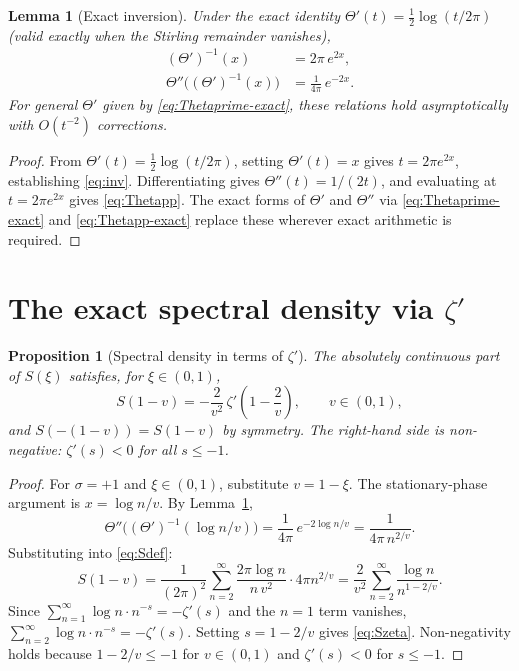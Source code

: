 \documentclass[11pt,reqno]{amsart}
\newtheorem{proposition}[theorem]{Proposition}
\newtheorem{lemma}[theorem]{Lemma}
\theoremstyle{definition}
\theoremstyle{remark}
\begin{document}
\begin{lemma}[Exact inversion]\label{lem:inv}
Under the exact identity \(\Theta'(t) = \tfrac{1}{2}\log(t/2\pi)\)
\textup{(}valid exactly when the Stirling remainder vanishes\textup{)},
\begin{align}
  (\Theta')^{-1}(x) &= 2\pi\,e^{2x}, \label{eq:inv}\\
  \Theta''\!\bigl((\Theta')^{-1}(x)\bigr) &= \frac{1}{4\pi}\,e^{-2x}. \label{eq:Thetapp}
\end{align}
For general \(\Theta'\) given by \eqref{eq:Thetaprime-exact}, these
relations hold asymptotically with \(O(t^{-2})\) corrections.
\end{lemma}

\begin{proof}
From \(\Theta'(t) = \tfrac{1}{2}\log(t/2\pi)\), setting
\(\Theta'(t)=x\) gives \(t = 2\pi e^{2x}\), establishing
\eqref{eq:inv}. Differentiating gives \(\Theta''(t) = 1/(2t)\), and
evaluating at \(t = 2\pi e^{2x}\) gives \eqref{eq:Thetapp}. The exact
forms of \(\Theta'\) and \(\Theta''\) via \eqref{eq:Thetaprime-exact}
and \eqref{eq:Thetapp-exact} replace these wherever exact arithmetic is
required.
\end{proof}

\section{The exact spectral density via \(\zeta'\)}

\begin{proposition}[Spectral density in terms of \(\zeta'\)]\label{prop:Szeta}
The absolutely continuous part of \(S(\xi)\) satisfies, for
\(\xi \in (0,1)\),
\begin{equation}\label{eq:Szeta}
  S(1-v) = -\frac{2}{v^2}\,\zeta'\!\!\left(1-\frac{2}{v}\right),
  \qquad v \in (0,1),
\end{equation}
and \(S(-(1-v)) = S(1-v)\) by symmetry. The right-hand side is
non-negative: \(\zeta'(s) < 0\) for all \(s \le -1\).
\end{proposition}

\begin{proof}
For \(\sigma = +1\) and \(\xi \in (0,1)\), substitute
\(v = 1-\xi\). The stationary-phase argument is \(x = \log n/v\).
By Lemma~\ref{lem:inv},
\[
  \Theta''\!\bigl((\Theta')^{-1}(\log n/v)\bigr)
  = \frac{1}{4\pi}\,e^{-2\log n/v}
  = \frac{1}{4\pi\,n^{2/v}}.
\]
Substituting into \eqref{eq:Sdef}:
\[
  S(1-v)
  = \frac{1}{(2\pi)^2}\sum_{n=2}^{\infty}
    \frac{2\pi\log n}{n\,v^2}\cdot 4\pi n^{2/v}
  = \frac{2}{v^2}\sum_{n=2}^{\infty}\frac{\log n}{n^{1-2/v}}.
\]
Since \(\sum_{n=1}^{\infty}\log n\cdot n^{-s} = -\zeta'(s)\) and the
\(n=1\) term vanishes,
\(\sum_{n=2}^{\infty}\log n\cdot n^{-s} = -\zeta'(s)\). Setting
\(s = 1-2/v\) gives \eqref{eq:Szeta}. Non-negativity holds because
\(1-2/v \le -1\) for \(v \in (0,1)\) and \(\zeta'(s) < 0\) for
\(s \le -1\).
\end{proof}
\end{document}
